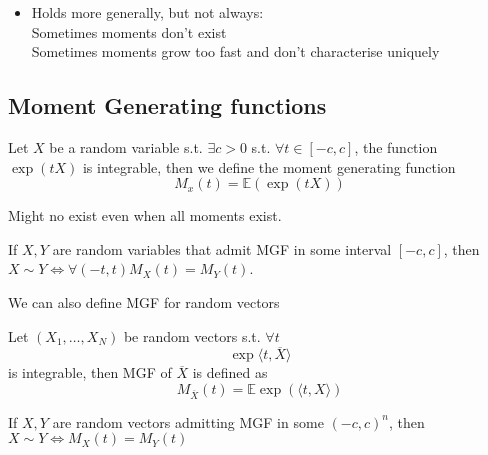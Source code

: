 \documentclass[../main.tex]{subfiles}
\begin{document}
\begin{rmq}
\begin{itemize}
\item Holds more generally, but not always:\\
	Sometimes moments don't exist\\
	Sometimes moments grow too fast and don't characterise uniquely
\end{itemize}

\end{rmq}
\subsection{Moment Generating functions}
\begin{defn}
	Let $X$ be a random variable s.t. $\exists c>0$ s.t. $\forall t \in [ -c,c]  $, the function $\exp( tX) $ is integrable, then we define the moment generating function
	\[ 
	M_x( t) = \mathbb{E}( \exp( tX) ) 
	\]
	
\end{defn}
\begin{rmq}
Might no exist even when all moments exist.
\end{rmq}
\begin{thm}
	If $X,Y$ are random variables that admit MGF in some interval $ [ -c,c] $, then $X\sim Y\iff \forall ( -t,t) M_X( t) = M_Y( t) $.
\end{thm}
We can also define MGF for random vectors
\begin{defn}
	Let $( X_1,\ldots, X_N) $ be random vectors s.t. $\forall t$ 
	\[ 
	\exp{ \langle t, \overline{X}\rangle }
	\]
	is integrable, then MGF of $ \overline{X}$ is defined as 
	\[ 
	M_{\overline{X}}( t) = \mathbb{E}\exp( \langle t,X\rangle ) 
	\]
	
\end{defn}
\begin{thm}
	If $X,Y$ are random vectors admitting MGF in some $ ( -c,c)^{n}$, then $X\sim Y\iff M_X( t) = M_Y( t) $ 
\end{thm}
\end{document}
